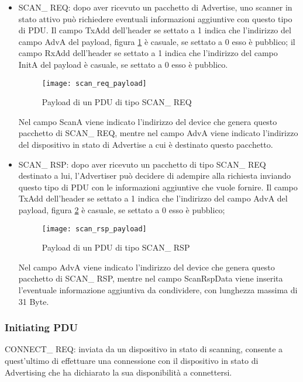 \begin{itemize}

\item SCAN\_ REQ: dopo aver ricevuto un pacchetto di Advertise, uno scanner in stato attivo può richiedere eventuali informazioni aggiuntive con questo tipo di PDU. Il campo TxAdd dell'header se settato a 1 indica che l'indirizzo del campo AdvA del payload, figura \ref{scan_req_payload} è casuale, se settato a 0 esso è pubblico; il campo RxAdd dell'header se settato a 1 indica che l'indirizzo del campo InitA del payload è casuale, se settato a 0 esso è pubblico.

\begin{figure}[H]
\texttt{[image: scan\_req\_payload]}
\centering
\caption{Payload di un PDU di tipo SCAN\_ REQ }
\label{scan_req_payload}
\end{figure}

Nel campo ScanA viene indicato l'indirizzo del device che genera questo pacchetto di SCAN\_ REQ, mentre nel campo AdvA viene indicato l'indirizzo del dispositivo in stato di Advertise a cui è destinato questo pacchetto.

\item SCAN\_ RSP: dopo aver ricevuto un pacchetto di tipo SCAN\_ REQ destinato a lui, l'Advertiser può decidere di adempire alla richiesta inviando questo tipo di PDU con le informazioni aggiuntive che vuole fornire. Il campo TxAdd dell'header se settato a 1 indica che l'indirizzo del campo AdvA del payload, figura \ref{scan_rsp_payload} è casuale, se settato a 0 esso è pubblico;

\begin{figure}[H]
\texttt{[image: scan\_rsp\_payload]}
\centering
\caption{Payload di un PDU di tipo SCAN\_ RSP }
\label{scan_rsp_payload}
\end{figure}

Nel campo AdvA viene indicato l'indirizzo del device che genera questo pacchetto di SCAN\_ RSP, mentre nel campo ScanRspData viene inserita l'eventuale informazione aggiuntiva da condividere, con lunghezza massima di 31 Byte.

\end{itemize}

\subsubsection{Initiating PDU}\label{conn_req}

CONNECT\_ REQ: inviata da un dispositivo in stato di scanning, consente a quest'ultimo di effettuare una connessione con il dispositivo in stato di Advertising che ha dichiarato la sua disponibilità a connettersi.

